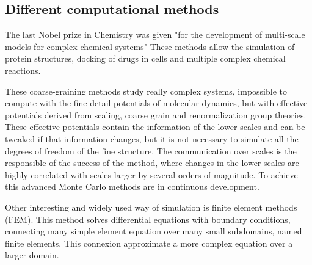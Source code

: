 \subsection{Different computational methods}  
The last Nobel prize in Chemistry was given "for the development of multi-scale
models for complex chemical systems" \citep{nobel:chemistry2013} These methods
allow the simulation of protein structures,  docking of drugs in cells and
multiple complex chemical reactions.

These coarse-graining methods study really complex
systems,\citep{de_pablo_coarse-grained_2011} impossible to compute with  the
fine detail potentials of molecular dynamics, but with effective potentials 
derived from scaling, coarse grain and renormalization group theories. These
effective potentials contain the information of the lower scales and can be
tweaked if that information changes, but it is not necessary to simulate all the
degrees of freedom of the fine structure. The communication over scales is the
responsible of the success of the method, where changes in the lower scales are
highly correlated with scales larger by several orders of magnitude. To achieve
this advanced Monte Carlo methods are in continuous development.
\citep{karayiannis_novel_2002}

Other interesting and widely used way of simulation is finite element methods
(FEM). This method solves differential equations with boundary conditions,
connecting many simple element equation over many small subdomains, named finite
elements. This connexion approximate a more complex equation over a larger
domain.




